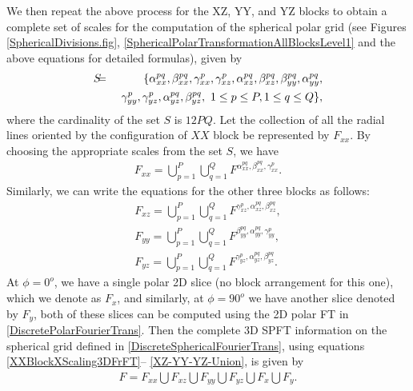 \documentclass{UCF_ETD}
\begin{document}
 We then repeat the above process for the XZ, YY, and YZ blocks to obtain a complete set of scales for the computation of the spherical polar grid (see Figures \ref{SphericalDivisions.fig}, \ref{SphericalPolarTransformationAllBlocksLevel1} and the above equations for detailed formulas), given by
 \begin{eqnarray*} S &\hskip-0.08in  = & \hskip-0.08in \{ \alpha^{pq}_{xx}, \beta^{pq}_{xx}, \gamma^{p}_{xx}, \gamma^{p}_{xz}, \alpha^{pq}_{xz}, \beta^{pq}_{xz}, \beta^{pq}_{yy}, \alpha^{pq}_{yy},\\
  & &   \  \gamma^{p}_{yy},  \gamma^{p}_{yz}, \alpha^{pq}_{yz}, \beta^{pq}_{yz},\  1\leq p\leq P, 1\leq q\leq Q \},\end{eqnarray*}
 where the cardinality of the set $S$ is $12PQ$.
 Let the collection of all the radial lines oriented by the configuration of $XX$ block be represented by $F_{xx}$.  By choosing the appropriate scales from the set $S$, we have
 \begin{eqnarray} \label{XX-Union}
 F_{xx} = \bigcup_{p=1}^{P} \bigcup_{q=1}^{Q} F^{\alpha^{pq}_{xx}, \beta^{pq}_{xx}, \gamma^{p}_{xx} }.
 \end{eqnarray}
 Similarly, we can write the equations for the other three blocks as follows:
 \begin{eqnarray}\label{XZ-YY-YZ-Union}
 F_{xz} = \bigcup_{p=1}^{P} \bigcup_{q=1}^{Q} F^{\gamma^{p}_{xz}, \alpha^{pq}_{xz}, \beta^{pq}_{xz}},\nonumber\\
 F_{yy} = \bigcup_{p=1}^{P} \bigcup_{q=1}^{Q} F^{\beta^{pq}_{yy}, \alpha^{pq}_{yy},  \gamma^{p}_{yy}},\nonumber \\
 F_{yz} = \bigcup_{p=1}^{P} \bigcup_{q=1}^{Q} F^{\gamma^{p}_{yz}, \alpha^{pq}_{yz}, \beta^{pq}_{yz}}.
 \end{eqnarray}
 At $\phi = 0^o$, we have a single polar 2D slice (no block arrangement for this one), which we denote as $F_x$, and similarly, at $\phi = 90^o$ we have another slice denoted by $F_y$, both of these slices can be computed using the 2D polar FT in \eqref{DiscretePolarFourierTrans}. Then the complete 3D SPFT information on the spherical grid defined in \eqref{DiscreteSphericalFourierTrans}, using equations \eqref{XXBlockXScaling3DFrFT}--
 \eqref{XZ-YY-YZ-Union}, 
 is given by
 \begin{eqnarray} \label{3D-Fast-Spherical-Polar-FT-union}
 F = F_{xx} \bigcup F_{xz} \bigcup F_{yy} \bigcup F_{yz} \bigcup F_x \bigcup F_y.
 \end{eqnarray}
 
\end{document}
